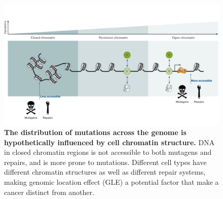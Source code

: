 \begin{figure}[h!]
    \centering
    \includegraphics[scale=0.24]{graphics/chromatin_demo.pdf}
    \caption{\textbf{The distribution of mutations across the genome is hypothetically influenced by cell chromatin structure.} DNA in closed chromatin regions is not accessible to both mutagens and repairs, and is more prone to mutations. Different cell types have different chromatin structures as well as different repair systems, making genomic location effect (GLE) a potential factor that make a cancer distinct from another.}
    \label{fig:chromatin_demo}
\end{figure}
